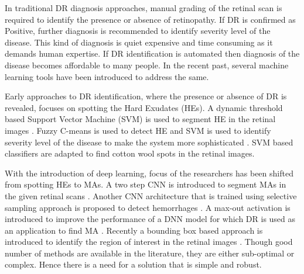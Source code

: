 \documentclass[electronics,article,accept ,moreauthors,pdftex]{mdpi}
\begin{document}
In traditional DR diagnosis approaches, manual grading of the retinal scan is required to identify the presence or absence of retinopathy. If DR is confirmed as Positive, further diagnosis is recommended to identify severity level of the disease. This kind of diagnosis is quiet expensive and time consuming as it demands human expertise. If DR identification is automated then diagnosis of the disease becomes affordable to many people. In the recent past, several machine learning tools have been introduced to address the same.

Early approaches to DR identification,  where the presence or absence of DR is revealed, focuses on spotting the Hard Exudates (HEs). A dynamic threshold based Support Vector Machine (SVM) is used to segment HE in the retinal images \cite{long2019automatic}. Fuzzy C-means is used to detect HE and SVM is used to identify severity level of the disease to make the system more sophisticated \cite{haloi2015gaussian}. SVM based classifiers are adapted to find cotton wool spots in the retinal images.

With the introduction of deep learning, focus of the researchers has been shifted from spotting HEs to MAs. A two step CNN is introduced to segment MAs in the given retinal scans \cite{noushin2019microaneurysm}. Another CNN architecture that is trained using selective sampling approach is proposed to detect hemorrhages \cite{grinsven2016fast}. A max-out activation is introduced to improve the performance of a DNN model for which DR is used as an application to find MA \cite{haloi2015improved}. Recently a  bounding box based approach is introduced to identify the region of interest in the retinal images    \cite{srivastava2017detecting}. Though good number of methods are available in the literature, they are either sub-optimal or complex. Hence there is a need for a solution that is simple and robust. 
\end{document}
